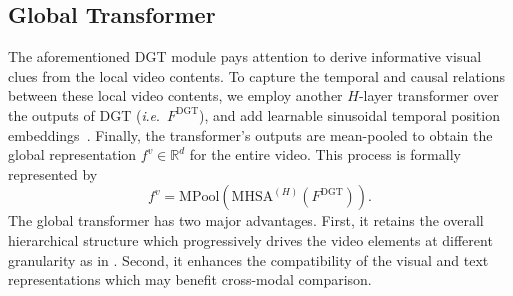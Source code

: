 \documentclass[10pt,journal,compsoc]{IEEEtran}
\newcommand{\ie}{\textit{i}.\textit{e}.}
\begin{document}
\subsection{Global Transformer}
\label{sec:gt}
The aforementioned DGT module pays attention to derive informative visual clues from the local video contents. To capture the temporal and causal relations between these local video contents, we employ another $H$-layer transformer over the outputs of DGT (\ie~$F^{\text{DGT}}$), and add learnable sinusoidal temporal position embeddings~\cite{devlin2018bert}. Finally, the transformer's outputs are mean-pooled to obtain the global representation $f^v\in\mathbb{R}^d$ for the entire video. This process is formally represented by
\begin{equation}
\label{equ:gbtrans}
    f^v = \text{MPool}(\text{MHSA}^{(H)}(F^{\text{DGT}})).
\end{equation}
The global transformer has two major advantages. First, it retains the overall hierarchical structure which progressively drives the video elements at different granularity as in \cite{xiao2021video}. Second, it enhances the compatibility of the visual and text representations which may benefit cross-modal comparison.
\setlength{\tabcolsep}{9pt}
\begin{table*}[t!]
\small
\centering
\caption{Dataset statistics. OE-1450: open-ended QA with 1450 global answer candidates. MC-5: multi-choice QA with 5 options and only one of them is correct. Note that TGIF-QA-R \cite{peng2021progressive} shares the same statistics with TGIF-QA.}
\label{tab:dset}
\vspace{-0.5em}
\begin{threeparttable}
    \vspace{-0.3cm}
\end{threeparttable}
\end{table*}
\end{document}
